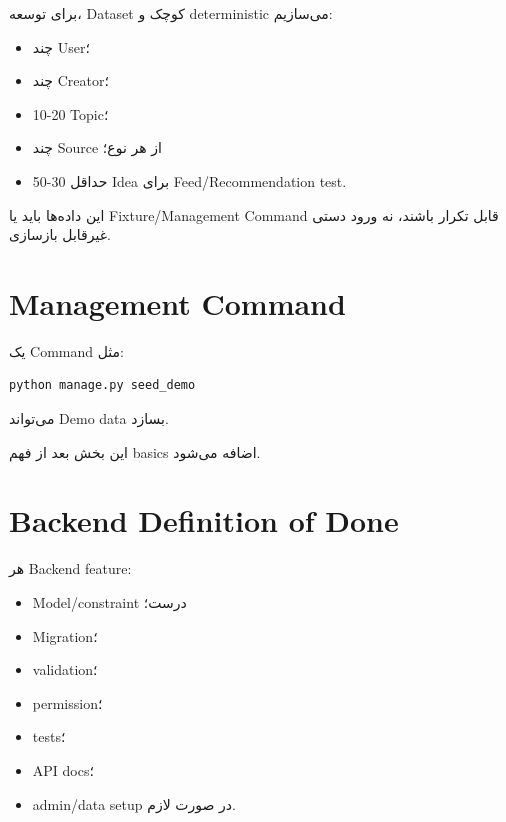 برای توسعه، Dataset کوچک و deterministic می‌سازیم:
\begin{itemize}
  \item چند User؛
  \item چند Creator؛
  \item 10-20 Topic؛
  \item چند Source از هر نوع؛
  \item حداقل 30-50 Idea برای Feed/Recommendation test.
\end{itemize}

این داده‌ها باید یا Fixture/Management Command قابل تکرار باشند، نه ورود دستی غیرقابل بازسازی.

\section{Management Command}

یک Command مثل:
\begin{latin}
\begin{lstlisting}
python manage.py seed_demo
\end{lstlisting}
\end{latin}
می‌تواند Demo data بسازد.

این بخش بعد از فهم basics اضافه می‌شود.

\section{Backend Definition of Done}

هر Backend feature:
\begin{itemize}
  \item Model/constraint درست؛
  \item Migration؛
  \item validation؛
  \item permission؛
  \item tests؛
  \item API docs؛
  \item admin/data setup در صورت لازم.
\end{itemize}
